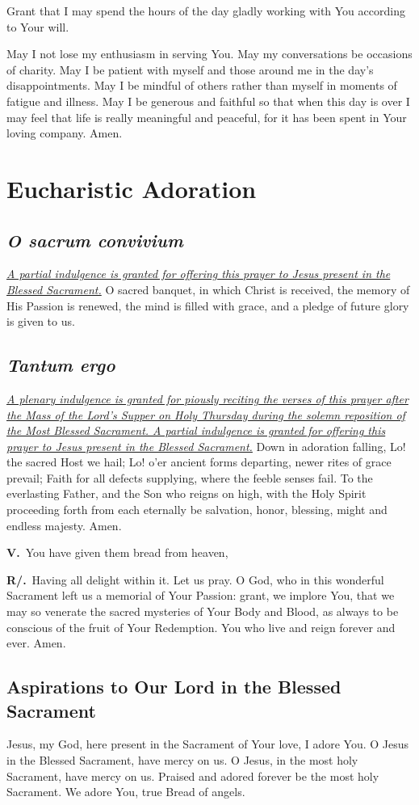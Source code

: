\documentclass[12pt]{article}
\newcommand{\prayersection}[1]{\section{#1}}
\newcommand{\prayertitle}[1]{\subsection{#1}}
\newcommand{\foreign}[1]{\textsl{#1}}
\newcommand{\note}[1]{{\small{\textsl{#1}}}\newline}
\newcommand{\linkednote}[2]{\hyperlink{#1}{\note{#2}}}
\newcommand{\versicle}{\textbf{V.}}
\newcommand{\response}{\textbf{R/.}}
\begin{document}
Grant that I may spend the hours of the day gladly working with You according to Your will.

May I not lose my enthusiasm in serving You.
May my conversations be occasions of charity.
May I be patient with myself and those around me in the day's disappointments.
May I be mindful of others rather than myself in moments of fatigue and illness.
May I be generous and faithful so that when this day is over I may feel that life is really meaningful and peaceful, for it has been spent in Your loving company.
Amen.

\newpage

\prayersection{Eucharistic Adoration}
\prayertitle{\foreign{O sacrum convivium}}
\linkednote{grant7}{A partial indulgence is granted for offering this prayer to Jesus present in the Blessed Sacrament.}
O sacred banquet, in which Christ is received, the memory of His Passion is renewed, the mind is filled with grace, and a pledge of future glory is given to us.

\prayertitle{\foreign{Tantum ergo}}
\linkednote{grant7}{A plenary indulgence is granted for piously reciting the verses of this prayer after the Mass of the Lord's Supper on Holy Thursday during the solemn reposition of the Most Blessed Sacrament.
A partial indulgence is granted for offering this prayer to Jesus present in the Blessed Sacrament.}
Down in adoration falling,
Lo! the sacred Host we hail;
Lo! o'er ancient forms departing,
newer rites of grace prevail;
Faith for all defects supplying,
where the feeble senses fail.
To the everlasting Father,
and the Son who reigns on high,
with the Holy Spirit proceeding
forth from each eternally
be salvation, honor, blessing,
might and endless majesty.
Amen.

\versicle\ You have given them bread from heaven,

\response\ Having all delight within it.
Let us pray.
O God, who in this wonderful Sacrament left us a memorial of Your Passion:
grant, we implore You, that we may so venerate the sacred mysteries of Your Body and Blood, as always to be conscious of the fruit of Your Redemption.
You who live and reign forever and ever.
Amen.

\prayertitle{Aspirations to Our Lord in the Blessed Sacrament}
Jesus, my God, here present in the Sacrament of Your love, I adore You. 
O Jesus in the Blessed Sacrament, have mercy on us. 
O Jesus, in the most holy Sacrament, have mercy on us. 
Praised and adored forever be the most holy Sacrament. 
We adore You, true Bread of angels. 
\end{document}
